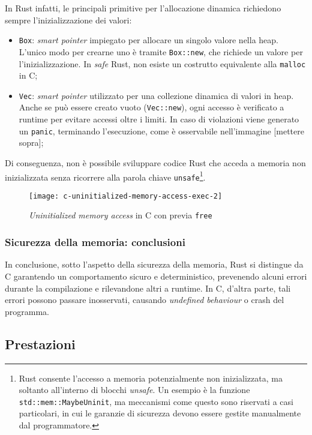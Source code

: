 In Rust infatti, le principali primitive per l'allocazione dinamica richiedono sempre l'inizializzazione dei valori:
\begin{itemize}
    \item \texttt{Box}: \textit{smart pointer} impiegato per allocare un singolo valore nella heap. L'unico modo per crearne uno è tramite \texttt{Box::new}, che richiede un valore per l'inizializzazione. In \textit{safe} Rust, non esiste un costrutto equivalente alla \texttt{malloc} in C;\ 
    \item \texttt{Vec}: \textit{smart pointer} utilizzato per una collezione dinamica di valori in heap. Anche se può essere creato vuoto (\texttt{Vec::new}), ogni accesso è verificato a runtime per evitare accessi oltre i limiti. In caso di violazioni viene generato un \texttt{panic}, terminando l'esecuzione, come è osservabile nell'immagine [mettere sopra];
\end{itemize}
Di conseguenza, non è possibile sviluppare codice Rust che acceda a memoria non inizializzata senza ricorrere alla parola chiave \texttt{unsafe}\footnote{Rust consente l'accesso a memoria potenzialmente non inizializzata, ma soltanto all'interno di blocchi \textit{unsafe}. Un esempio è la funzione \texttt{std::mem::MaybeUninit}, ma meccanismi come questo sono riservati a casi particolari, in cui le garanzie di sicurezza devono essere gestite manualmente dal programmatore.}.
\begin{figure}[htbp]
\begin{center}
    \texttt{[image: c-uninitialized-memory-access-exec-2]}
    \caption{\textit{Uninitialized memory access} in C con previa \texttt{free}}\label{c:uninitialized-memory-access-exec-2}
    \end{center}
\end{figure}

\subsubsection{Sicurezza della memoria: conclusioni}
In conclusione, sotto l'aspetto della sicurezza della memoria, Rust si distingue da C garantendo un comportamento sicuro e deterministico, prevenendo
alcuni errori durante la compilazione e rilevandone altri a runtime. In C, d'altra parte, tali errori possono passare inosservati, causando
\textit{undefined behaviour} o crash del programma.

\subsection{Prestazioni}

